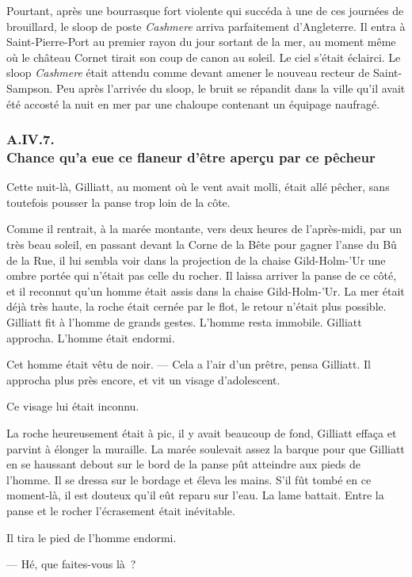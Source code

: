 \documentclass[french,twoside]{book} %
\begin{document}
Pourtant, après une bourrasque fort violente qui succéda à une de ces journées de brouillard, le sloop de poste \emph{Cashmere} arriva parfaitement d’Angleterre. Il entra à Saint-Pierre-Port au premier rayon du jour sortant de la mer, au moment même où le château Cornet  tirait son coup de canon au soleil. Le ciel s’était éclairci. Le sloop \emph{Cashmere} était attendu comme devant amener le nouveau recteur de Saint-Sampson. Peu après l’arrivée du sloop, le bruit se répandit dans la ville qu’il avait été accosté la nuit en mer par une chaloupe contenant un équipage naufragé.
 \subsubsection[{A.IV.7. Chance qu’a eue ce flaneur d’être aperçu par ce pêcheur}]{A.IV.7. \\
Chance qu’a eue ce flaneur d’être aperçu par ce pêcheur}
\noindent Cette nuit-là, Gilliatt, au moment où le vent avait molli, était allé pêcher, sans toutefois pousser la panse trop loin de la côte.\par
Comme il rentrait, à la marée montante, vers deux heures de l’après-midi, par un très beau soleil, en passant devant la Corne de la Bête pour gagner l’anse du Bû de la Rue, il lui sembla voir dans la projection de la chaise Gild-Holm-’Ur une ombre portée qui n’était pas celle du rocher. Il laissa arriver la panse de ce côté, et il reconnut qu’un homme était assis dans la chaise Gild-Holm-’Ur. La mer était déjà très haute, la roche était cernée par le flot, le retour n’était plus possible. Gilliatt fit à l’homme de grands gestes. L’homme resta immobile. Gilliatt approcha. L’homme était endormi.\par
Cet homme était vêtu de noir. — Cela a l’air d’un prêtre, pensa Gilliatt. Il approcha plus près encore, et vit un visage d’adolescent.\par
 Ce visage lui était inconnu.\par
La roche heureusement était à pic, il y avait beaucoup de fond, Gilliatt effaça et parvint à élonger la muraille. La marée soulevait assez la barque pour que Gilliatt en se haussant debout sur le bord de la panse pût atteindre aux pieds de l’homme. Il se dressa sur le bordage et éleva les mains. S’il fût tombé en ce moment-là, il est douteux qu’il eût reparu sur l’eau. La lame battait. Entre la panse et le rocher l’écrasement était inévitable.\par
Il tira le pied de l’homme endormi.\par
— Hé, que faites-vous là ?\par
\end{document}
